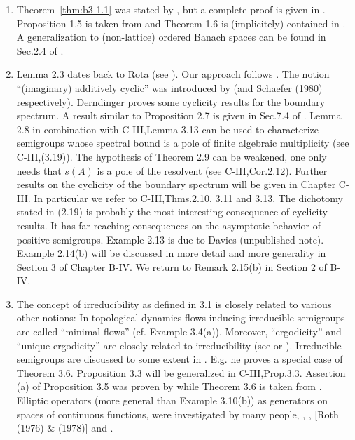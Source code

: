 \begin{enumerate}[label=\emph{Section \arabic*:}, wide]
\item
Theorem~\ref{thm:b3-1.1} was stated by \citet{karlin:1959}, but a complete proof is given in \citet{derndinger:1980}.
Proposition 1.5 is taken from \citet{greiner:1982} and Theorem 1.6 is (implicitely) contained in \citet{derndingernagel:1979}.
A generalization to (non-lattice) ordered Banach spaces can be found in Sec.2.4 of \citet{battyrobinson:1984}.

\item
Lemma 2.3 dates back to Rota (see \citet{schaefer:1974}).
Our approach follows \citet{greiner:1981}.
The notion \enquote{(imaginary) additively cyclic} was introduced by \citet{derndinger:1980} (and {Schaefer (1980)} respectively).
Derndinger proves some cyclicity results for the boundary spectrum.
A result similar to Proposition 2.7 is given in Sec.7.4 of \citet{davies:1980}.
Lemma 2.8 in combination with C-III,Lemma 3.13 can be used to characterize semigroups whose spectral bound is a pole of finite algebraic multiplicity (see C-III,(3.19)).
The hypothesis of Theorem 2.9 can be weakened, one only needs that $s(A)$ is a pole of the resolvent (see C-III,Cor.2.12).
Further results on the cyclicity of the boundary spectrum will be given in Chapter C-III.
In particular we refer to C-III,Thms.2.10, 3.11 and 3.13.
The dichotomy stated in (2.19) is probably the most interesting consequence of cyclicity results.
It has far reaching consequences on the asymptotic behavior of positive semigroups.
Example 2.13 is due to Davies (unpublished note).
Example 2.14(b) will be discussed in more detail and more generality in Section 3 of Chapter B-IV.
We return to Remark 2.15(b) in Section 2 of B-IV.

\item
The concept of irreducibility as defined in 3.1 is closely related to various other notions:
In topological dynamics flows inducing irreducible semigroups are called \enquote{minimal flows} (cf. Example 3.4(a)).
Moreover, \enquote{ergodicity} and \enquote{unique ergodicity} are closely related to irreducibility (see\citet{cornfeldfominsinai:1982} or \citet{krengel:1985}).
Irreducible semigroups are discussed to some extent in \citet{davies:1980}.
E.g. he proves a special case of Theorem 3.6.
Proposition 3.3 will be generalized in C-III,Prop.3.3.
Assertion (a) of Proposition 3.5 was proven by \citet{schaefer:1983} while Theorem 3.6 is taken from \citet{greiner:1982}.
Elliptic operators (more general than Example 3.10(b)) as generators on spaces of continuous functions, were investigated by many people, \eg \citet{bonycourrègepriouret:1968}, \citet{kuhn:1985}, [Roth (1976) \& (1978)] and \citet{stewart:1974}.


\end{enumerate}
